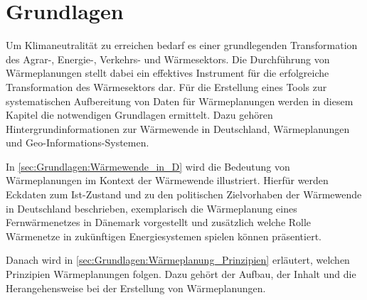 
\chapter{Grundlagen}
	
	Um Klimaneutralität zu erreichen bedarf es einer grundlegenden Transformation des Agrar-, Energie-, Verkehrs- und Wärmesektors. Die Durchführung von Wärmeplanungen stellt dabei ein effektives Instrument für die erfolgreiche Transformation des Wärmesektors dar. Für die Erstellung eines Tools zur systematischen Aufbereitung von Daten für Wärmeplanungen werden in diesem Kapitel die notwendigen Grundlagen ermittelt. Dazu gehören Hintergrundinformationen zur Wärmewende in Deutschland, Wärmeplanungen und Geo-Informations-Systemen. 
	
	In \autoref{sec:Grundlagen:Wärmewende_in_D} wird die Bedeutung von Wärmeplanungen im Kontext der Wärmewende illustriert. Hierfür werden Eckdaten zum Ist-Zustand und zu den politischen Zielvorhaben der Wärmewende in Deutschland beschrieben, exemplarisch die Wärmeplanung eines Fernwärmenetzes in Dänemark vorgestellt und zusätzlich welche Rolle Wärmenetze in zukünftigen Energiesystemen spielen können präsentiert. 
	
	Danach wird in \autoref{sec:Grundlagen:Wärmeplanung_Prinzipien} erläutert, welchen Prinzipien Wärmeplanungen folgen. Dazu gehört der Aufbau, der Inhalt und die Herangehensweise bei der Erstellung von Wärmeplanungen. 
	
